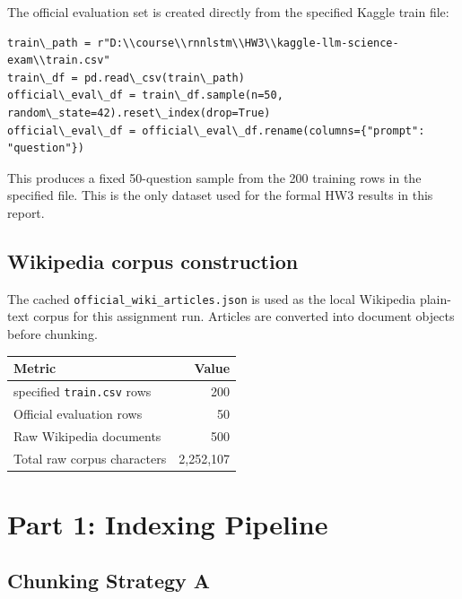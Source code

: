 \documentclass[12pt,a4paper]{article}
\begin{document}
The official evaluation set is created directly from the specified Kaggle train file:

\begin{verbatim}
train\_path = r"D:\\course\\rnnlstm\\HW3\\kaggle-llm-science-exam\\train.csv"
train\_df = pd.read\_csv(train\_path)
official\_eval\_df = train\_df.sample(n=50, random\_state=42).reset\_index(drop=True)
official\_eval\_df = official\_eval\_df.rename(columns={"prompt": "question"})
\end{verbatim}

This produces a fixed 50-question sample from the 200 training rows in the specified file. This is the only dataset used for the formal HW3 results in this report.

\subsection{Wikipedia corpus construction}

The cached \texttt{official\_wiki\_articles.json} is used as the local Wikipedia plain-text corpus for this assignment run. Articles are converted into document objects before chunking.

\begin{table}[H]
\centering
\begin{tabular}{lr}
\toprule
\textbf{Metric} & \textbf{Value} \\
\midrule
specified \texttt{train.csv} rows & 200 \\
Official evaluation rows & 50 \\
Raw Wikipedia documents & 500 \\
Total raw corpus characters & 2,252,107 \\
\bottomrule
\end{tabular}
\end{table}

\section{Part 1: Indexing Pipeline}

\subsection{Chunking Strategy A}
\end{document}
